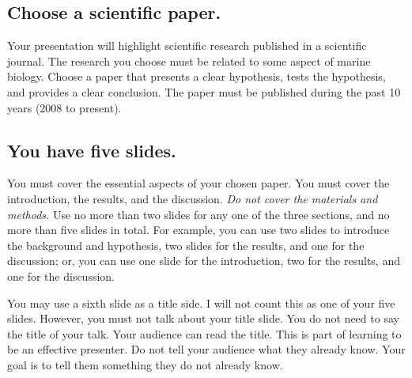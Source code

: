 \documentclass[letterpaper]{memoir}
\newcommand{\insertslide}[2]{%
  \framebox{\texttt{[image: \#2]}}
}
\begin{document}
\subsection*{Choose a scientific paper.}

Your presentation will highlight scientific research published in a scientific journal. The research you choose must be related to some aspect of marine biology. Choose a paper that presents a clear hypothesis, tests the hypothesis, and provides a clear conclusion.  The paper must be published during the past 10 years (2008 to present).

%
% 
\subsection*{You have five slides.}

You must cover the essential aspects of your chosen paper. You must cover the introduction, the results, and the discussion. \emph{Do not cover the materials and methods.} Use no more than two slides for any one of the three sections, and no more than five slides in total. For example, you can use two slides to introduce the background and hypothesis, two slides for the results, and one for the discussion; or, you can use one slide for the introduction, two for the results, and one for the discussion.

You may use a sixth slide as a title side. I will not count this as one of your five slides. However, you must not talk about your title slide. You do not need to say the title of your talk. Your audience can read the title. This is part of learning to be an effective presenter. Do not tell your audience what they already know. Your goal is to tell them something they do not already know.
\end{document}

